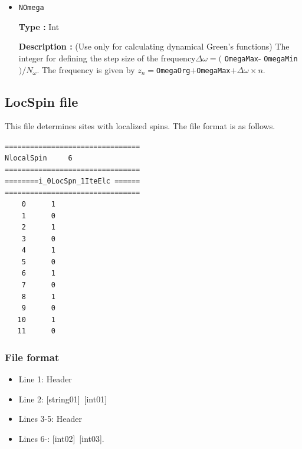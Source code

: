 \begin{itemize}
    {\bf Description :} (Use only for calculating dynamical Green's functions) 
    The upper limit of the frequency from \verb|OmegaOrg|.
    Specify the real and imaginary parts in that order separated by a space, and if there is no imaginary part, a real part of the frequency is only given.
  
\item \verb|NOmega|

{\bf Type :} Int

{\bf Description :} {(Use only for calculating dynamical Green's functions) 
 The integer for defining the step size of the frequency$\Delta \omega = ($ \verb|OmegaMax|- \verb|OmegaMin|$)/N_{\omega}$. The frequency is given by $z_n=$\verb|OmegaOrg|$+$\verb|OmegaMax|$+ \Delta \omega \times n$.} 
 
 \end{itemize}


\newpage
\subsection{LocSpin file}
\label{Subsec:locspn}
This file determines sites with localized spins. The file format is as follows.\\
\begin{minipage}{10cm}
\begin{screen}
\begin{verbatim}
================================ 
NlocalSpin     6  
================================ 
========i_0LocSpn_1IteElc ====== 
================================ 
    0      1
    1      0
    2      1
    3      0
    4      1
    5      0
    6      1
    7      0
    8      1
    9      0
   10      1
   11      0
\end{verbatim}
\end{screen}
\end{minipage}


\subsubsection{File format}
\begin{itemize}
   \item  Line 1:  Header
   \item  Line 2:   [string01]~[int01]
   \item  Lines 3-5:  Header
   \item  Lines 6-:  [int02]~[int03].
  \end{itemize}
